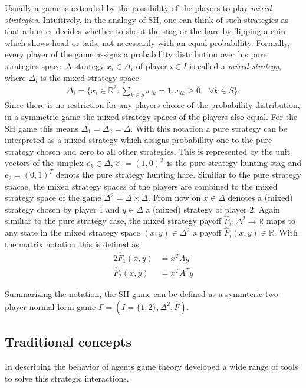 \documentclass[11pt]{article}
\newcommand{\realnumb}{\mathbb{R}}
\begin{document}
Usually a game is extended by the possibility of the players to play
\textit{mixed strategies}. Intuitively, in the analogy of SH, one can think of
such strategies as that a hunter decides whether to shoot the stag or the hare
by flipping a coin which shows head or tails, not necessarily with an equal
probabillity. 
Formally, every player of the game assigns a probabillity distribution over 
his pure strategies space. A strategy $x_i \in \Delta_i$ of player $i \in I$ 
is called a \textit{mixed strategy}, where $\Delta_i$ is the mixed strategy 
space 
\begin{align*}
        \Delta_i = \{ x_i \in \realnumb^2 : \sum_{k \in S} x_{ik} = 1, x_{ik} \geq 0 \quad
\forall k \in S\}.
\end{align*}
Since there is no restriction for any players choice of the probabillity 
distribution, in a symmetric game the mixed strategy spaces of the players
also equal. For the SH game this means $\Delta_1 = \Delta_2 = \Delta$.
With this notation a pure strategy can be interpreted as a mixed strategy
which assigns probabillity one to the pure strategy chosen and zero to all
other strategies. This is represented by the unit vectors of the simplex 
$\hat{e}_k \in \Delta$, $\hat{e}_1 = (1,0)^T$ is the pure strategy hunting stag 
and $\hat{e}_2 =(0,1)^T$ denots the pure strategy hunting hare.
Similiar to the pure strategy spacae, the mixed strategy spaces of the players 
are combined to the mixed strategy space of the game $\Delta^2 =
\Delta \times \Delta$. From now on $x \in \Delta$ denotes a (mixed) strategy
chosen by player 1 and $y \in \Delta$ a (mixed) strategy of player 2.
Again similiar to the pure strategy case, the mixed strategy payoff 
$\hat{F}_i:\Delta^2 \rightarrow \realnumb$ maps to any state in the mixed strategy
space  $(x,y) \in \Delta^2$ a payoff $\hat{F}_i(x,y) \in \realnumb$.
With the matrix notation this is defined as: 
\begin{alignat*}{2}
        \hat{F}_1(x,y) &= x^T A y \\
        \hat{F}_2(x,y) &= x^T A^T y 
\end{alignat*}

Summarizing the notation, the SH game can be defined as a symmteric two-player
normal form game $\Gamma = (I=\{1,2\}, \Delta^2, \hat{F})$.

\subsection{Traditional concepts}
\label{sec:traditionalconcepts}
In describing the behavior of agents game theory developed a wide range of 
tools to solve this strategic interactions. 
\end{document}
